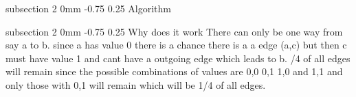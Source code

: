 \documentclass[a4paper,11pt]{article}
\makeatletter
\renewcommand{\subsection}{\@startsection
   {subsection}%
   {2}%
   {0mm}%
   {-0.75\baselineskip}%
   {0.25\baselineskip}%
   {\rmfamily\normalfont\slshape\normalsize}}%
\makeatother
\begin{document}
\subsection{Algorithm}
\begin{algorithm}
\end{algorithm}
\subsection{Why does it work}
There can only be one way from say a to b. since a has value 0 there is a chance there is a a edge (a,c) but then c must have value 1 and cant have a outgoing edge which leads to b.
\newline
{}/4 of all edges will remain since the possible combinations of values are 0,0 0,1 1,0 and 1,1 and only those with 0,1 will remain which will be 1/4 of all edges. 
\end{document}

